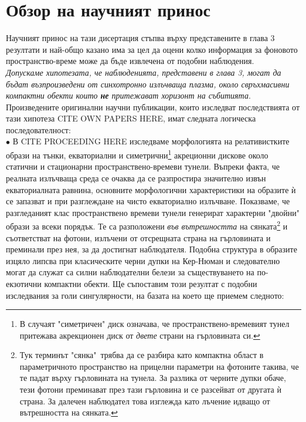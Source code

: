 \section{Обзор на научният принос}

Научният принос на тази дисертация стъпва върху представените в глава 3 резултати и най-общо казано има за цел да оцени колко информация за фоновото пространство-време може да бъде извлечена от подобни наблюдения.\\

 \emph{Допускаме хипотезата, че наблюденията, представени в глава 3, могат да бъдат възпроизведени от синхотронно излъчваща плазма, около свръхмасивни компактни обекти които \textbf{не} притежават хоризонт на събитията}.\\\newline
Произведените оригинални научни публикации, които изследват последствията от тази хипотеза CITE OWN PAPERS HERE, имат следната логическа последователност: \\

\noindent$\bullet$ В CITE PROCEEDING HERE изследваме морфологията на релативистките образи на тънки, екваториални и симетрични\footnote{ В случаят "симетричен" диск означава, че пространствено-времевият тунел притежава акрекционен диск от \emph{двете} страни на гърловината си.} акреционни дискове около статични и стационарни пространствено-времеви тунели. Въпреки факта, че реалната излъчваща среда се очаква да се разпростира значително извън екваториалната равнина, основните морфологични характеристики на образите ѝ се запазват и при разглеждане на чисто екваториално излъчване. Показваме, че разгледаният клас пространствено времеви тунели генерират характерни "двойни"$\,$ образи за всеки порядък. Те са разположени \emph{във вътрешността} на сянката\footnote{Тук терминът "сянка"$\,$ трябва да се разбира като компактна област в параметричното пространство на прицелни параметри на фотоните такива, че те падат върху гърловината на тунела. За разлика от черните дупки обаче, тези фотони преминават през тази гърловина и се разсейват от другата ѝ страна. За далечен наблюдател това изглежда като лъчение идващо от вътрешността на сянката.} и съответстват на фотони, излъчени от отсрещната страна на гърловината и преминали през нея, за да достигнат наблюдателя. Подобна структура в образите изцяло липсва при класическите черни дупки на Кер-Нюман и следователно могат да служат са силни наблюдателни белези за съществуването на по-екзотични компактни обекти. Ще съпоставим този резултат с подобни изследвания за голи сингулярности, на базата на което ще приемем следното:\\

